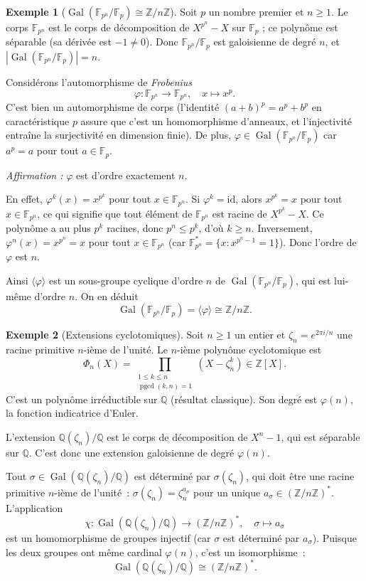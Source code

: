 \documentclass[12pt,a4paper,openany]{book}
\theoremstyle{definition}
\newtheorem{exemple}{Exemple}[chapter]
\newcommand{\Z}{\mathbb{Z}}
\newcommand{\Q}{\mathbb{Q}}
\newcommand{\F}{\mathbb{F}}
\newcommand{\Gal}{\operatorname{Gal}}
\newcommand{\pgcd}{\operatorname{pgcd}}
\begin{document}
\begin{exemple}[$\Gal(\F_{p^n}/\F_p) \cong \Z/n\Z$]\label{ex:gal-corps-finis}
Soit $p$ un nombre premier et $n \geq 1$. Le corps $\F_{p^n}$ est le corps
de décomposition de $X^{p^n} - X$ sur $\F_p$ ; ce polynôme est séparable
(sa dérivée est $-1 \neq 0$). Donc $\F_{p^n}/\F_p$ est galoisienne de
degré $n$, et $|\Gal(\F_{p^n}/\F_p)| = n$.

Considérons l'automorphisme de \emph{Frobenius}
\[
  \varphi \colon \F_{p^n} \to \F_{p^n}, \quad x \mapsto x^p.
\]
C'est bien un automorphisme de corps (l'identité $(a+b)^p = a^p + b^p$
en caractéristique $p$ assure que c'est un homomorphisme d'anneaux, et
l'injectivité entraîne la surjectivité en dimension finie).
De plus, $\varphi \in \Gal(\F_{p^n}/\F_p)$ car $a^p = a$ pour tout
$a \in \F_p$.

\emph{Affirmation :} $\varphi$ est d'ordre exactement $n$.

En effet, $\varphi^k(x) = x^{p^k}$ pour tout $x \in \F_{p^n}$.
Si $\varphi^k = \mathrm{id}$, alors $x^{p^k} = x$ pour tout
$x \in \F_{p^n}$, ce qui signifie que tout élément de $\F_{p^n}$ est
racine de $X^{p^k} - X$. Ce polynôme a au plus $p^k$ racines, donc
$p^n \leq p^k$, d'où $k \geq n$. Inversement, $\varphi^n(x) = x^{p^n} = x$
pour tout $x \in \F_{p^n}$ (car $\F_{p^n}^* = \{x : x^{p^n-1} = 1\}$).
Donc l'ordre de $\varphi$ est $n$.

Ainsi $\langle\varphi\rangle$ est un sous-groupe cyclique d'ordre $n$ de
$\Gal(\F_{p^n}/\F_p)$, qui est lui-même d'ordre $n$. On en déduit
\[
  \Gal(\F_{p^n}/\F_p) = \langle\varphi\rangle \cong \Z/n\Z.
\]
\end{exemple}

\begin{exemple}[Extensions cyclotomiques]\label{ex:gal-cyclotomique}
Soit $n \geq 1$ un entier et $\zeta_n = e^{2\pi i/n}$ une racine primitive
$n$-ième de l'unité. Le $n$-ième polynôme cyclotomique est
\[
  \Phi_n(X) = \prod_{\substack{1 \leq k \leq n \\ \pgcd(k,n)=1}}
  (X - \zeta_n^k) \in \Z[X].
\]
C'est un polynôme irréductible sur $\Q$ (résultat classique). Son degré
est $\varphi(n)$, la fonction indicatrice d'Euler.

L'extension $\Q(\zeta_n)/\Q$ est le corps de décomposition de $X^n - 1$,
qui est séparable sur $\Q$. C'est donc une extension galoisienne de degré
$\varphi(n)$.

Tout $\sigma \in \Gal(\Q(\zeta_n)/\Q)$ est déterminé par $\sigma(\zeta_n)$,
qui doit être une racine primitive $n$-ième de l'unité~: $\sigma(\zeta_n)
= \zeta_n^{a_\sigma}$ pour un unique $a_\sigma \in (\Z/n\Z)^*$. L'application
\[
  \chi \colon \Gal(\Q(\zeta_n)/\Q) \to (\Z/n\Z)^*, \quad
  \sigma \mapsto a_\sigma
\]
est un homomorphisme de groupes injectif (car $\sigma$ est déterminé par
$a_\sigma$). Puisque les deux groupes ont même cardinal $\varphi(n)$,
c'est un isomorphisme~:
\[
  \Gal(\Q(\zeta_n)/\Q) \cong (\Z/n\Z)^*.
\]
\end{exemple}
\end{document}
